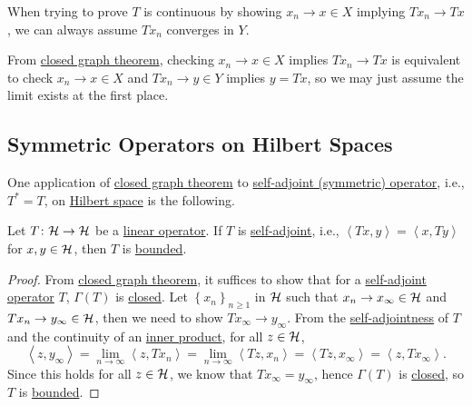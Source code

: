 \begin{remark}
	When trying to prove \(T\) is continuous by showing \(x_n \to x\in X\) implying \(Tx_n \to Tx\), we can always assume \(Tx_n\) converges in \(Y\).
\end{remark}
\begin{explanation}
	From \hyperref[thm:closed-graph]{closed graph theorem}, checking \(x_n \to x\in X\) implies \(Tx_n \to Tx\) is equivalent to check \(x_n \to x\in X\) and \(Tx_n \to y\in Y\) implies \(y = Tx\), so we may just assume the limit exists at the first place.
\end{explanation}

\subsection{Symmetric Operators on Hilbert Spaces}
One application of \hyperref[thm:closed-graph]{closed graph theorem} to \hyperref[def:self-adjoint-op]{self-adjoint (symmetric) operator}, i.e., \(T^{\ast} = T\), on \hyperref[def:Hilbert-space]{Hilbert space} is the following.

\begin{theorem}\label{thm:Hellinger-Toeplitz}
	Let \(T\colon \mathcal{\MakeUppercase{h}} \to \mathcal{\MakeUppercase{h}} \) be a \hyperref[def:linear-op]{linear operator}. If \(T\) is \hyperref[def:self-adjoint-op]{self-adjoint}, i.e., \(\left\langle Tx, y \right\rangle  = \left\langle x, Ty \right\rangle\) for \(x, y\in \mathcal{\MakeUppercase{h}} \), then \(T\) is \hyperref[rmk:bounded-op]{bounded}.
\end{theorem}
\begin{proof}
	From \hyperref[thm:closed-graph]{closed graph theorem}, it suffices to show that for a \hyperref[def:self-adjoint-op]{self-adjoint operator} \(T\), \(\Gamma (T)\) is \hyperref[def:closed-graph]{closed}. Let \(\left\{ x_n \right\} _{n\geq 1}\) in \(\mathcal{\MakeUppercase{h}} \) such that \(x_n \to x_\infty \in \mathcal{\MakeUppercase{h}} \) and \(Tx_n \to y_\infty \in\mathcal{\MakeUppercase{h}} \), then we need to show \(Tx_\infty \to y_\infty \). From the \hyperref[def:self-adjoint-op]{self-adjointness} of \(T\) and the continuity of an \hyperref[def:inner-product]{inner product}, for all \(z\in \mathcal{\MakeUppercase{h}} \),
	\[
		\left\langle z, y_\infty  \right\rangle = \lim\limits_{n \to \infty} \left\langle z, Tx_n \right\rangle = \lim\limits_{n \to \infty} \left\langle Tz, x_n \right\rangle = \left\langle Tz, x_\infty  \right\rangle = \left\langle z, Tx_\infty  \right\rangle.
	\]
	Since this holds for all \(z\in \mathcal{\MakeUppercase{h}} \), we know that \(Tx_\infty = y_\infty \), hence \(\Gamma (T)\) is \hyperref[def:closed-graph]{closed}, so \(T\) is \hyperref[rmk:bounded-op]{bounded}.
\end{proof}

